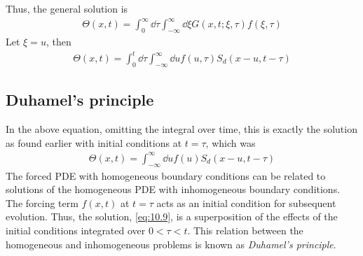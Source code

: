 Thus, the general solution is
\begin{align*}
	\Theta(x,t) = \int_0^\infty \dd{\tau} \int_{-\infty}^\infty \dd{\xi} G(x,t;\xi,\tau) f(\xi, \tau)
\end{align*}
Let $\xi = u$, then
\begin{align} \label{eq:10.9}
	\Theta(x,t) = \int_0^t \dd{\tau} \int_{-\infty}^\infty \dd{u} f(u, \tau) S_d(x-u, t-\tau)
\end{align}

\subsection{Duhamel's principle}
In the above equation, omitting the integral over time, this is exactly the solution as found earlier with initial conditions at $t = \tau$, which was
\begin{align*}
	\Theta(x,t) = \int_{-\infty}^\infty \dd{u} f(u) S_d(x-u, t-\tau)
\end{align*}
The forced PDE with homogeneous boundary conditions can be related to solutions of the homogeneous PDE with inhomogeneous boundary conditions.
The forcing term $f(x,t)$ at $t = \tau$ acts as an initial condition for subsequent evolution.
Thus, the solution, \cref{eq:10.9}, is a superposition of the effects of the initial conditions integrated over $0 < \tau < t$.
This relation between the homogeneous and inhomogeneous problems is known as \textit{Duhamel's principle}.

